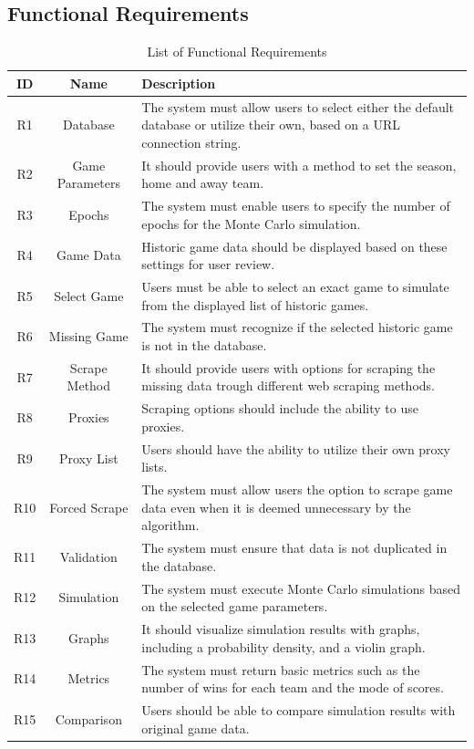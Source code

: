 \documentclass{thesis-ekf}
\theoremstyle{definition}
\theoremstyle{remark}
\begin{document}
\subsection{Functional Requirements}
\begin{table}[H]
	\centering
	\begin{tabular}{|c|c|>{\raggedright\arraybackslash}p{10cm}|}
		\hline
		\textbf{ID} & \textbf{Name} & \textbf{Description} \\ 
		\hline
		R1	& Database & The system must allow users to select either the default database or utilize their own, based on a URL connection string. \\ 
		\hline
		R2	& Game Parameters & It should provide users with a method to set the season, home and away team. \\ 
		\hline
		R3	& Epochs & The system must enable users to specify the number of epochs for the Monte Carlo simulation. \\ 
		\hline
		R4	& Game Data & Historic game data should be displayed based on these settings for user review. \\ 
		\hline
		R5	& Select Game & Users must be able to select an exact game to simulate from the displayed list of historic games. \\ 
		\hline
		R6	& Missing Game & The system must recognize if the selected historic game is not in the database. \\ 
		\hline
		R7	& Scrape Method & It should provide users with options for scraping the missing data trough different web scraping methods. \\ 
		\hline
		R8	& Proxies & Scraping options should include the ability to use proxies. \\ 
		\hline
		R9	& Proxy List & Users should have the ability to utilize their own proxy lists. \\ 
		\hline
		R10	& Forced Scrape & The system must allow users the option to scrape game data even when it is deemed unnecessary by the algorithm. \\ 
		\hline
		R11	& Validation & The system must ensure that data is not duplicated in the database. \\ 
		\hline
		R12	& Simulation & The system must execute Monte Carlo simulations based on the selected game parameters. \\ 
		\hline
		R13	& Graphs & It should visualize simulation results with graphs, including a probability density, and a violin graph. \\ 
		\hline
		R14	& Metrics & The system must return basic metrics such as the number of wins for each team and the mode of scores. \\ 
		\hline
		R15	& Comparison & Users should be able to compare simulation results with original game data. \\ 
		\hline
	\end{tabular}
	\caption{List of Functional Requirements}
	\label{table-funct-req}
\end{table}
\end{document}
